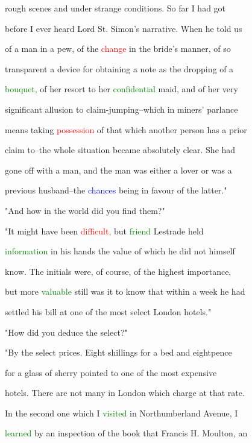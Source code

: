  rough scenes and under strange conditions. So far I had got

 before I ever heard \textcolor{BurntOrange}{Lord} St. Simon's narrative. When he told us

 of a man in a pew, of the \textcolor{red}{change} in the \textcolor{BurntOrange}{bride's} manner, of so

 transparent a device for obtaining a note as the dropping of a

 \textcolor{green}{bouquet,} of her resort to her \textcolor{green}{confidential} maid, and of her very

 significant allusion to claim-jumping--which in miners' parlance

 means taking \textcolor{red}{possession} of that which another person has a prior

 claim to--the whole situation became absolutely clear. She had

 gone off with a man, and the man was either a \textcolor{BurntOrange}{lover} or was a

 previous husband--the \textcolor{blue}{chances} being in favour of the latter."



 "And how in the world did you find them?"



 "It might have been \textcolor{red}{difficult,} but \textcolor{green}{friend} Lestrade held

 \textcolor{green}{information} in his hands the value of which he did not himself

 know. The initials were, of course, of the highest \textcolor{BurntOrange}{importance,}

 but more \textcolor{green}{valuable} still was it to know that within a week he had

 settled his bill at one of the most select London hotels."



 "How did you deduce the select?"



 "By the select prices. Eight shillings for a bed and eightpence

 for a glass of sherry pointed to one of the most expensive

 hotels. There are not many in London which charge at that rate.

 In the second one which I \textcolor{green}{visited} in Northumberland Avenue, I

 \textcolor{green}{learned} by an inspection of the book that Francis H. Moulton, an

